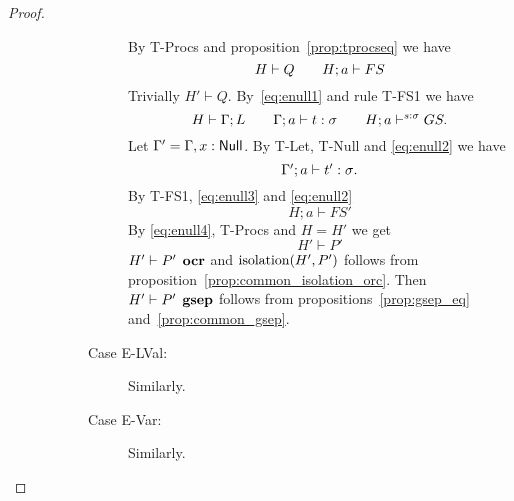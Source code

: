 \begin{proof}
\begin{description}
\begin{description}
\begin{description}
              By {\sc T-Procs} and proposition~\ref{prop:tprocseq} we have 
              \begin{equation} \label{eq:enull1}
               H \vdash Q  \quad\quad H; a \vdash FS 
              \end{equation}
              Trivially $H' \vdash Q$. 
              By~\eqref{eq:enull1} and rule {\sc T-FS1} we have
              \begin{equation} \label{eq:enull2}
                H \vdash \Gamma; L \quad\quad \mbox{$\Gamma;a\vdash t:\sigma$}
                \quad\quad H; a \vdash^{s: \sigma} GS.
              \end{equation}
              Let $\Gamma' = \Gamma, x: \mbox{$\mathsf{Null}$}$. By {\sc T-Let}, {\sc
              T-Null} and \eqref{eq:enull2} we have
              \begin{equation} \label{eq:enull3}
                \mbox{$\Gamma';a\vdash t':\sigma$}.
              \end{equation}
              By {\sc T-FS1}, \eqref{eq:enull3} and \eqref{eq:enull2}
              \begin{equation}\label{eq:enull4}
                H;a \vdash FS'
              \end{equation}
              By \eqref{eq:enull4}, {\sc T-Procs} and $H = H'$ we get  
              \begin{equation}
                H' \vdash P'
              \end{equation}
              $H' \vdash P' \:\: \mbox{\bf ocr}$ and $\mbox{$\mathrm{isolation}$}{(H', P')}$ follows from
              proposition~\ref{prop:common_isolation_orc}. Then $H' \vdash P'
              \:\: \mbox{\bf gsep}$ follows from propositions~\ref{prop:gsep_eq}
              and~\ref{prop:common_gsep}.
            \item[Case {\sc E-LVal}:] Similarly.
            \item[Case {\sc E-Var}:] Similarly.
          \end{description}
      \end{description}
  \end{description}
\end{proof}











